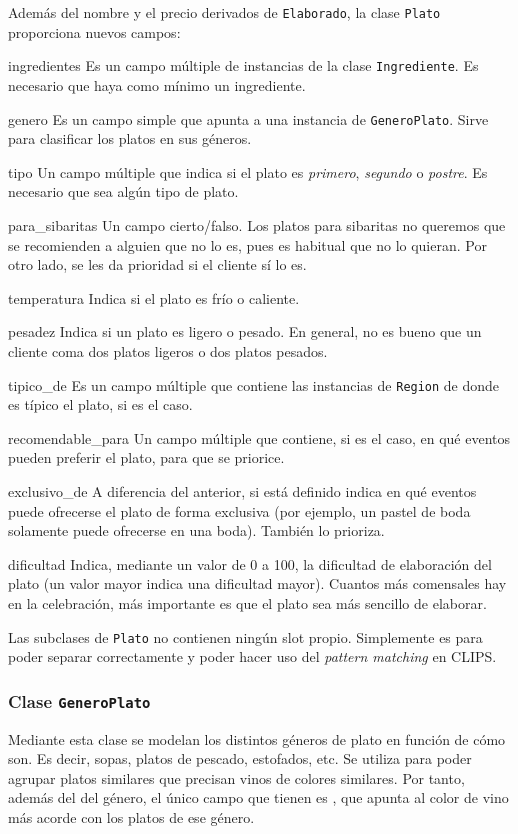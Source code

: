 Además del nombre y el precio derivados de \verb+Elaborado+, la clase
\verb+Plato+ proporciona nuevos campos:
\begin{slotlist}
\item[ingredientes] Es un campo múltiple de instancias de la clase
  \verb+Ingrediente+. Es necesario que haya como mínimo un ingrediente.
\item[genero] Es un campo simple que apunta a una instancia de
  \verb+GeneroPlato+. Sirve para clasificar los platos en sus géneros.
\item[tipo] Un campo múltiple que indica si el plato es \emph{primero},
  \emph{segundo} o \emph{postre}. Es necesario que sea algún tipo de plato.
\item[para\_sibaritas] Un campo cierto/falso. Los platos para sibaritas no
  queremos que se recomienden a alguien que no lo es, pues es habitual que no
  lo quieran. Por otro lado, se les da prioridad si el cliente sí lo es.
\item[temperatura] Indica si el plato es frío o caliente.
\item[pesadez] Indica si un plato es ligero o pesado. En general, no es bueno
  que un cliente coma dos platos ligeros o dos platos pesados.
\item[tipico\_de] Es un campo múltiple que contiene las instancias de
  \verb+Region+ de donde es típico el plato, si es el caso.
\item[recomendable\_para] Un campo múltiple que contiene, si es el caso, en qué
  eventos pueden preferir el plato, para que se priorice.
\item[exclusivo\_de] A diferencia del anterior, si está definido indica en qué
  eventos puede ofrecerse el plato de forma exclusiva (por ejemplo, un pastel
  de boda solamente puede ofrecerse en una boda). También lo prioriza.
\item[dificultad] Indica, mediante un valor de 0 a 100, la dificultad de
  elaboración del plato (un valor mayor indica una dificultad mayor). Cuantos
  más comensales hay en la celebración, más importante es que el plato sea más
  sencillo de elaborar.
\end{slotlist}

Las subclases de \verb+Plato+ no contienen ningún slot propio. Simplemente es
para poder separar correctamente y poder hacer uso del \emph{pattern matching}
en CLIPS.

\subsubsection{Clase \texttt{GeneroPlato}}
Mediante esta clase se modelan los distintos géneros de plato en función de
cómo son. Es decir, sopas, platos de pescado, estofados, etc. Se utiliza para
poder agrupar platos similares que precisan vinos de colores similares. Por
tanto, además del  del género, el único campo que tienen es
, que apunta al color de vino más acorde con los platos de ese
género.

